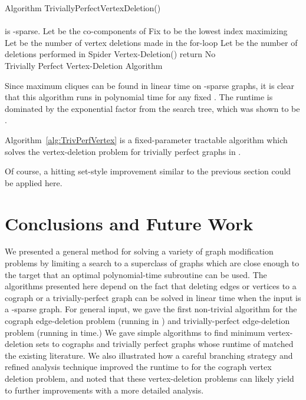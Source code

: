 \documentclass{llncs}
\begin{document}
\begin{algorithm}[H]
\SetAlgoLined Algorithm {\sc TriviallyPerfectVertexDeletion()}\\
\ \\
 is -sparse. Let  be the co-components of \;
Fix  to be the lowest index maximizing \;
Let  be the number of vertex deletions made in the for-loop\;
Let  be the number of deletions performed in {\sc Spider Vertex-Deletion}()\;
return {\sc No}\;
\ \\
\caption{Trivially Perfect Vertex-Deletion Algorithm}
\label{alg:TrivPerfVertex}
\end{algorithm}

Since maximum cliques can be found in linear time on -sparse graphs, it is clear that this algorithm runs in polynomial time for any fixed . The runtime is dominated by the exponential factor from the search tree, which was shown to be .

\begin{theorem}
Algorithm~\ref{alg:TrivPerfVertex} is a fixed-parameter tractable algorithm which solves the vertex-deletion problem for trivially perfect graphs in .
\end{theorem}

Of course, a hitting set-style improvement similar to the previous section could be applied here.

\section{Conclusions and Future Work}

We presented a general method for solving a variety of graph modification problems by limiting a search to a superclass of graphs which are close enough to the target that an optimal polynomial-time subroutine can be used. The algorithms presented here depend on the fact that deleting edges or vertices to a cograph or a trivially-perfect graph can be solved in linear time when the input is a -sparse graph. For general input, we gave the first non-trivial algorithm for the cograph edge-deletion problem (running in ) and trivially-perfect edge-deletion problem (running in  time.) We gave simple algorithms to find minimum vertex-deletion sets to cographs and trivially perfect graphs whose runtime of  matched the existing literature. We also illustrated how a careful branching strategy and refined analysis technique improved the runtime to  for the cograph vertex deletion problem, and noted that these vertex-deletion problems can likely yield to further improvements with a more detailed analysis.
\end{document}
